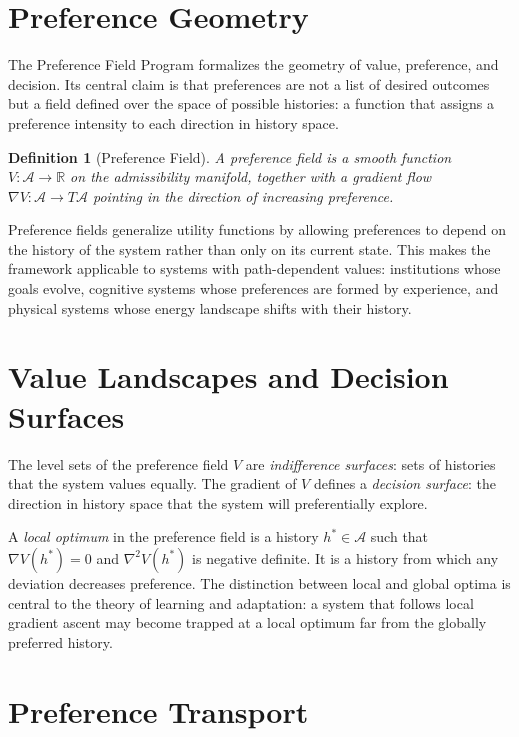 \documentclass[12pt,a4paper]{book}
\newtheorem{definition}[theorem]{Definition}
\theoremstyle{remark}
\theoremstyle{definition}
\begin{document}
\section{Preference Geometry}

The Preference Field Program formalizes the geometry of value, preference,
and decision. Its central claim is that preferences are not a list of
desired outcomes but a field defined over the space of possible histories:
a function that assigns a preference intensity to each direction in history
space.

\begin{definition}[Preference Field]
A \emph{preference field} is a smooth function $V : \mathcal{A} \to \mathbb{R}$
on the admissibility manifold, together with a gradient flow
$\nabla V : \mathcal{A} \to T\mathcal{A}$ pointing in the direction of
increasing preference.
\end{definition}

Preference fields generalize utility functions by allowing preferences to
depend on the history of the system rather than only on its current state.
This makes the framework applicable to systems with path-dependent values:
institutions whose goals evolve, cognitive systems whose preferences are
formed by experience, and physical systems whose energy landscape shifts
with their history.

\section{Value Landscapes and Decision Surfaces}

The level sets of the preference field $V$ are \emph{indifference surfaces}:
sets of histories that the system values equally. The gradient of $V$
defines a \emph{decision surface}: the direction in history space that
the system will preferentially explore.

A \emph{local optimum} in the preference field is a history $h^* \in
\mathcal{A}$ such that $\nabla V(h^*) = 0$ and $\nabla^2 V(h^*)$ is
negative definite. It is a history from which any deviation decreases
preference. The distinction between local and global optima is central
to the theory of learning and adaptation: a system that follows local
gradient ascent may become trapped at a local optimum far from the
globally preferred history.

\section{Preference Transport}
\end{document}

